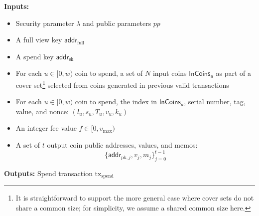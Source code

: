 \documentclass{llncs}
\newcommand{\func}[1]{\mathsf{#1}}
\newcommand{\addr}{\func{addr}}
\begin{document}
\textbf{Inputs:}
\begin{itemize}
    \item Security parameter $\lambda$ and public parameters $pp$
    \item A full view key $\addr_{\text{full}}$
    \item A spend key $\addr_{\text{sk}}$
    \item For each $u \in [0,w)$ coin to spend, a set of $N$ input coins $\func{InCoins}_u$ as part of a cover set\footnote{It is straightforward to support the more general case where cover sets do not share a common size; for simplicity, we assume a shared common size here.} selected from coins generated in previous valid transactions
    \item For each $u \in [0,w)$ coin to spend, the index in $\func{InCoins}_u$, serial number, tag, value, and nonce: $(l_u, s_u, T_u, v_u, k_u)$
    \item An integer fee value $f \in [0,v_{\text{max}})$
    \item A set of $t$ output coin public addresses, values, and memos: $$\{\addr_{\text{pk},j}, v_j, m_j\}_{j=0}^{t-1}$$
\end{itemize}

\textbf{Outputs:} Spend transaction $\text{tx}_{\text{spend}}$
\end{document}
